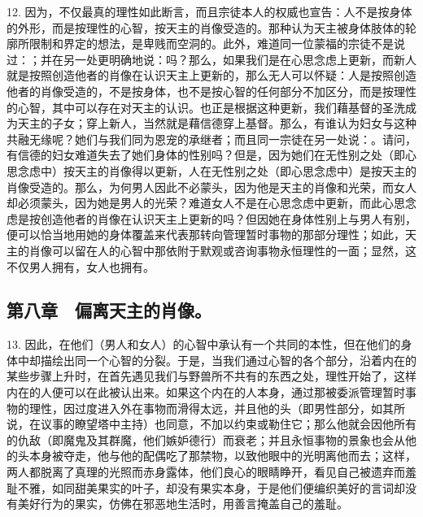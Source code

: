 12. 因为，不仅最真的理性如此断言，而且宗徒本人的权威也宣告：人不是按身体的外形，而是按理性的心智，按天主的肖像受造的。那种认为天主被身体肢体的轮廓所限制和界定的想法，是卑贱而空洞的。此外，难道同一位蒙福的宗徒不是说过：；并在另一处更明确地说：吗？那么，如果我们是在心思念虑上更新，而新人就是按照创造他者的肖像在认识天主上更新的，那么无人可以怀疑：人是按照创造他者的肖像受造的，不是按身体，也不是按心智的任何部分不加区分，而是按理性的心智，其中可以存在对天主的认识。也正是根据这种更新，我们藉基督的圣洗成为天主的子女；穿上新人，当然就是藉信德穿上基督。那么，有谁认为妇女与这种共融无缘呢？她们与我们同为恩宠的承继者；而且同一宗徒在另一处说：。请问，有信德的妇女难道失去了她们身体的性别吗？但是，因为她们在无性别之处（即心思念虑中）按天主的肖像得以更新，人在无性别之处（即心思念虑中）是按天主的肖像受造的。那么，为何男人因此不必蒙头，因为他是天主的肖像和光荣，而女人却必须蒙头，因为她是男人的光荣？难道女人不是在心思念虑中更新，而此心思念虑是按创造他者的肖像在认识天主上更新的吗？但因她在身体性别上与男人有别，便可以恰当地用她的身体覆盖来代表那转向管理暂时事物的那部分理性；如此，天主的肖像可以留在人的心智中那依附于默观或咨询事物永恒理性的一面；显然，这不仅男人拥有，女人也拥有。\par


\subsection{第八章　偏离天主的肖像。}

13. 因此，在他们（男人和女人）的心智中承认有一个共同的本性，但在他们的身体中却描绘出同一个心智的分裂。于是，当我们通过心智的各个部分，沿着内在的某些步骤上升时，在首先遇见我们与野兽所不共有的东西之处，理性开始了，这样内在的人便可以在此被认出来。如果这个内在的人本身，通过那被委派管理暂时事物的理性，因过度进入外在事物而滑得太远，并且他的头（即男性部分，如其所说，在议事的瞭望塔中主持）也同意，不加以约束或勒住它；那么他就会因他所有的仇敌（即魔鬼及其群魔，他们嫉妒德行）而衰老；并且永恒事物的景象也会从他的头本身被夺走，他与他的配偶吃了那禁物，以致他眼中的光明离他而去；这样，两人都脱离了真理的光照而赤身露体，他们良心的眼睛睁开，看见自己被遗弃而羞耻不雅，如同甜美果实的叶子，却没有果实本身，于是他们便编织美好的言词却没有美好行为的果实，仿佛在邪恶地生活时，用善言掩盖自己的羞耻。\par

